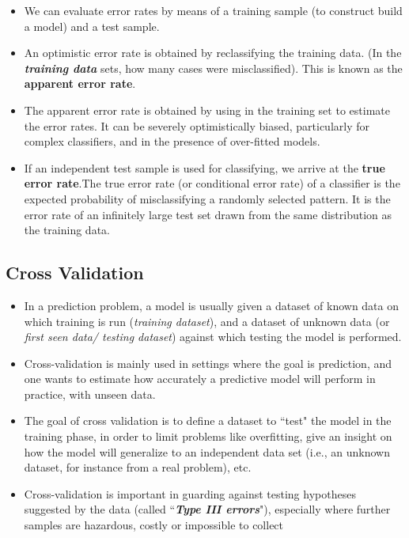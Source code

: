 \documentclass[]{report}
\begin{document}
\begin{itemize}
	\item We can evaluate error rates by means of a training sample (to construct build a model) and a test sample.
	
	
	\item 	An optimistic error rate is obtained by reclassifying the training data. (In the \textbf{\textit{training data}} sets, how many cases were misclassified). This is known as the \textbf{apparent error rate}.
	
	
	\item 	The apparent error rate is obtained by using in the training set to estimate
	the error rates. It can be severely optimistically biased, particularly for complex classifiers, and in the presence of over-fitted models.
	
	
	\item	If an independent test sample is used for classifying, we arrive at the  \textbf{true error rate}.The true error rate (or conditional error rate) of a classifier is the expected
	probability of misclassifying a randomly selected pattern.
	It is the error rate of an infinitely large test set drawn from the same distribution as the training data.
\end{itemize}








\subsection{Cross Validation}
\begin{itemize}
\item In a prediction problem, a model is usually given a dataset of known data 
on which training is run (\textit{training dataset}), and a dataset of unknown data (or \textit{first seen data/ testing dataset}) against which testing the model is performed.
\item Cross-validation is mainly used in settings where the goal is prediction, and one wants to estimate how accurately a predictive model will perform in practice, with unseen data.
\item The goal of cross validation is to define a dataset to ``test" the model in the training phase, in order to limit problems like overfitting, give an insight on how the model will generalize to an independent data set (i.e., an unknown dataset, for instance from a real problem), etc.
\item Cross-validation is important in guarding against testing hypotheses suggested by the data (called ``\textbf{\textit{Type III errors}}"), especially where further samples 
are hazardous, costly or impossible to collect 
\end{itemize}
\end{document}
